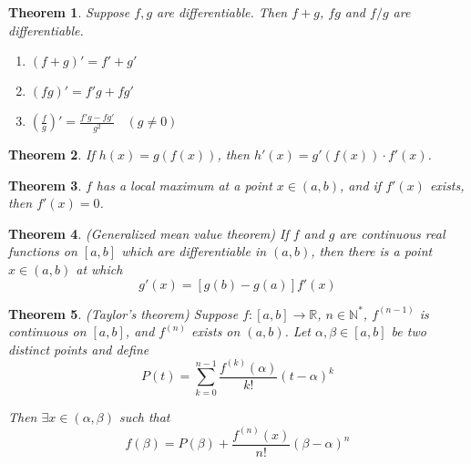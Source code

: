 \documentclass[aps,pra,onecolumn,notitlepage,superscriptaddress]{revtex4-1}
\newcommand{\N}{\mathbb{N}}
\newcommand{\R}{\mathbb{R}}
\newtheorem{theo}{Theorem}
\begin{document}
    \begin{theo}
        Suppose $f,g$ are differentiable. Then $f+g$, $fg$ and $f/g$ are differentiable.
        \begin{enumerate}
            \item $(f+g)' = f'+g'$
            \item $(fg)' = f'g+fg'$
            \item $(\frac{f}{g})' = \frac{f'g-fg'}{g^2} \ \ \ \ (g \neq 0)$
        \end{enumerate}
    \end{theo}

    \begin{theo}
        If $h(x) = g(f(x))$, then $h'(x) = g'(f(x)) \cdot f'(x)$.
    \end{theo}

    \begin{theo}
        $f$ has a local maximum at a point $x \in (a, b)$, and if $f'(x)$ exists, then $f'(x) = 0$.
    \end{theo}

    \begin{theo}
        (Generalized mean value theorem) If $f$ and $g$ are continuous real functions on $[a,b]$ which are differentiable in $(a,b)$, then there is a point $x \in (a,b)$ at which 
        \begin{equation}
            [f(b)-f(a)] g'(x) = [g(b)-g(a)] f'(x)
        \end{equation}
    \end{theo}

    \begin{theo}
        (Taylor's theorem) Suppose $f : [a,b] \to \R$, $n \in \N^*$, $f^{(n-1)}$ is continuous on $[a,b]$, and $f^{(n)}$ exists on $(a,b)$. Let $\alpha, \beta \in [a,b]$ be two distinct points and define
        \begin{equation}
            P(t) = \sum_{k=0}^{n-1} \frac{f^{(k)}(\alpha)}{k!} (t-\alpha)^k
        \end{equation}

        Then $\exists x \in (\alpha, \beta)$ such that 
        \begin{equation}
            f(\beta) = P(\beta) + \frac{f^{(n)}(x)}{n!} (\beta-\alpha)^n
        \end{equation}
    \end{theo}
\end{document}
